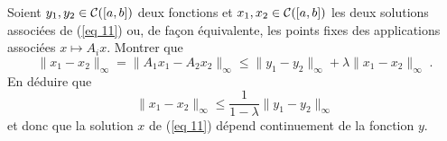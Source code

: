 {\begin{enumerate}
{Soient $y_1,y_2\in{\cal C}([a,b])$ deux fonctions et $x_1,
x_2\in{\cal C}([a,b])$ les deux solutions associ\'ees de (\ref{eq
11}) ou, de fa\c{c}on \'equivalente, les points fixes des
applications associ\'ees $x\mapsto A_i x$. Montrer que
$$ \| x_1 - x_2\|_\infty = \| A_1 x_1 -A_2
x_2\|_\infty\leq \|y_1 -y_2\|_\infty+ \lambda \|x_1 -x_2 \|_\infty \;
.$$ En d\'eduire que
$$\|x_1 -x_2\|_\infty    \leq \frac{1}{1-\lambda}\| y_1
-y_2\|_\infty$$ et donc que la solution $x$ de (\ref{eq 11})
d\'epend continuement de la fonction $y$.}
\end{enumerate}
}
